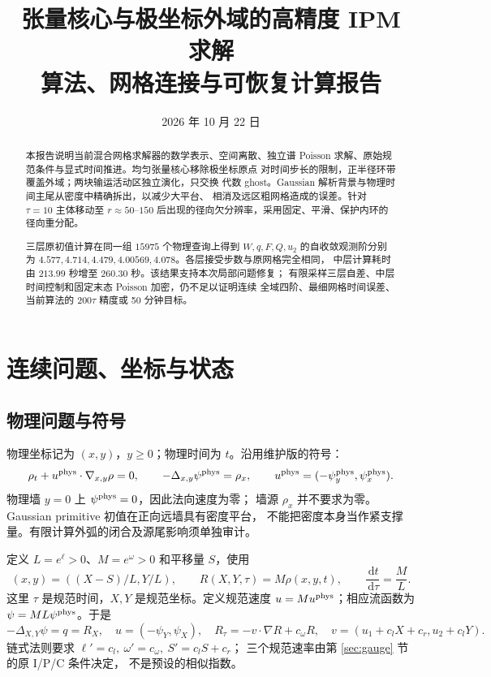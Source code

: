 \documentclass[UTF8,fontset=fandol,11pt,a4paper]{ctexart}
\title{张量核心与极坐标外域的高精度 IPM 求解\\
  \large 算法、网格连接与可恢复计算报告}
\author{\code{src/+ipm_cr}}
\date{2026 年 10 月 22 日}
\newcommand{\dd}{\,\mathrm d}
\begin{document}
\maketitle
\begin{abstract}
本报告说明当前混合网格求解器的数学表示、空间离散、独立谱
Poisson 求解、原始规范条件与显式时间推进。均匀张量核心移除极坐标原点
对时间步长的限制，正半径环带覆盖外域；两块输运活动区独立演化，只交换
代数 ghost。Gaussian 解析背景与物理时间主尾从密度中精确拆出，以减少大平台、
相消及远区粗网格造成的误差。针对 $\tau=10$ 主体移动至 $r\approx50$--$150$
后出现的径向欠分辨率，采用固定、平滑、保护内环的径向重分配。

三层原初值计算在同一组 $15975$ 个物理查询上得到
$W,q,F,Q,u_2$ 的自收敛观测阶分别为
$4.577,4.714,4.479,4.00569,4.078$。各层接受步数与原网格完全相同，
中层计算耗时由 $213.99$ 秒增至 $260.30$ 秒。该结果支持本次局部问题修复；
有限采样三层自差、中层时间控制和固定末态 Poisson 加密，仍不足以证明连续
全域四阶、最细网格时间误差、当前算法的 $200\tau$ 精度或 50 分钟目标。
\end{abstract}
\tableofcontents

\clearpage
\section{连续问题、坐标与状态}
\subsection{物理问题与符号}
物理坐标记为 $(x,y)$，$y\ge0$；物理时间为 $t$。沿用维护版的符号：
\begin{equation}
 \rho_t+u^{\rm phys}\cdot\nabla_{x,y}\rho=0,\qquad
 -\Delta_{x,y}\psi^{\rm phys}=\rho_x,\qquad
 u^{\rm phys}=(-\psi^{\rm phys}_y,\psi^{\rm phys}_x).
 \label{eq:physical}
\end{equation}
物理墙 $y=0$ 上 $\psi^{\rm phys}=0$，因此法向速度为零；
墙源 $\rho_x$ 并不要求为零。Gaussian primitive 初值在正向远墙具有密度平台，
不能把密度本身当作紧支撑量。有限计算外弧的闭合及源尾影响须单独审计。

定义 $L=e^\ell>0$、$M=e^\omega>0$ 和平移量 $S$，使用
\begin{equation}
 (x,y)=((X-S)/L,Y/L),\qquad R(X,Y,\tau)=M\rho(x,y,t),
 \qquad \frac{\dd t}{\dd\tau}=\frac ML.
 \label{eq:transform}
\end{equation}
这里 $\tau$ 是规范时间，$X,Y$ 是规范坐标。定义规范速度
$u=M u^{\rm phys}$；相应流函数为 $\psi=ML\psi^{\rm phys}$。于是
\begin{equation}
 -\Delta_{X,Y}\psi=q=R_X,\quad u=(-\psi_Y,\psi_X),\quad
 R_\tau=-v\cdot\nabla R+c_\omega R,
 \quad v=(u_1+c_lX+c_r,u_2+c_lY).
 \label{eq:canonical}
\end{equation}
链式法则要求 $\ell'=c_l,\ \omega'=c_\omega,\ S'=c_lS+c_r$；
三个规范速率由第 \ref{sec:gauge} 节的原 I/P/C 条件决定，
不是预设的相似指数。
\end{document}

